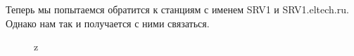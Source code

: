 \documentclass[a4paper,12pt]{article}
\begin{document}
Теперь мы попытаемся обратится к станциям с именем SRV1 и SRV1.eltech.ru.
Однако нам так и получается с ними связаться.
\begin{figure}[H]
    z
\end{figure}
\end{document}
